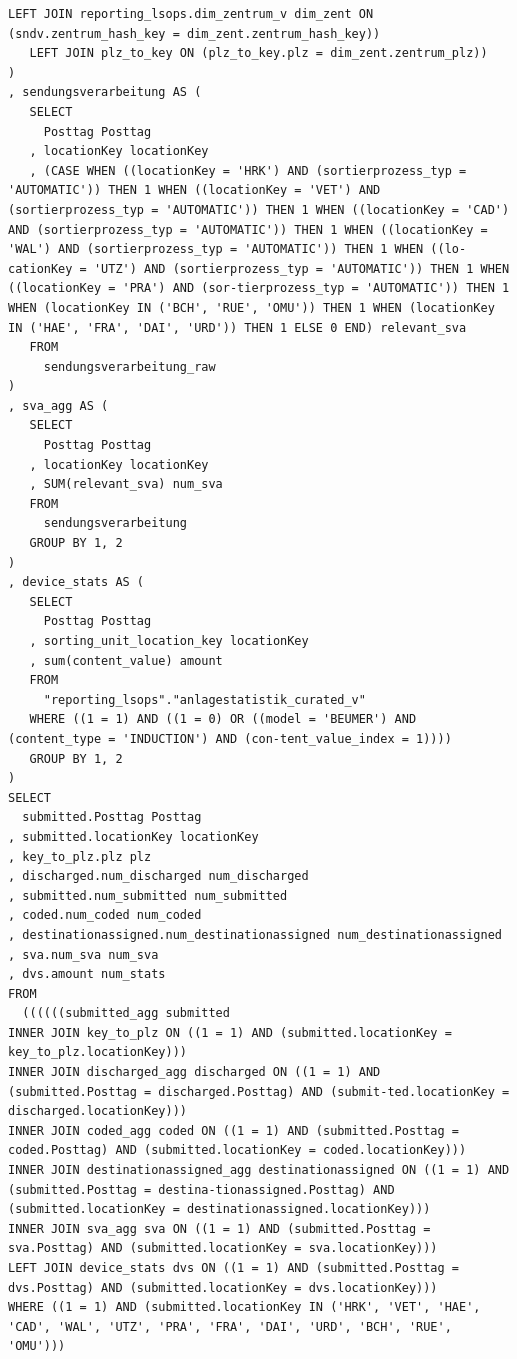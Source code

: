 \begin{lstlisting}[style=sqlstyle]
   LEFT JOIN reporting_lsops.dim_zentrum_v dim_zent ON (sndv.zentrum_hash_key = dim_zent.zentrum_hash_key))
   LEFT JOIN plz_to_key ON (plz_to_key.plz = dim_zent.zentrum_plz))
) 
, sendungsverarbeitung AS (
   SELECT
     Posttag Posttag
   , locationKey locationKey
   , (CASE WHEN ((locationKey = 'HRK') AND (sortierprozess_typ = 'AUTOMATIC')) THEN 1 WHEN ((locationKey = 'VET') AND (sortierprozess_typ = 'AUTOMATIC')) THEN 1 WHEN ((locationKey = 'CAD') AND (sortierprozess_typ = 'AUTOMATIC')) THEN 1 WHEN ((locationKey = 'WAL') AND (sortierprozess_typ = 'AUTOMATIC')) THEN 1 WHEN ((lo-cationKey = 'UTZ') AND (sortierprozess_typ = 'AUTOMATIC')) THEN 1 WHEN ((locationKey = 'PRA') AND (sor-tierprozess_typ = 'AUTOMATIC')) THEN 1 WHEN (locationKey IN ('BCH', 'RUE', 'OMU')) THEN 1 WHEN (locationKey IN ('HAE', 'FRA', 'DAI', 'URD')) THEN 1 ELSE 0 END) relevant_sva
   FROM
     sendungsverarbeitung_raw
) 
, sva_agg AS (
   SELECT
     Posttag Posttag
   , locationKey locationKey
   , SUM(relevant_sva) num_sva
   FROM
     sendungsverarbeitung
   GROUP BY 1, 2
) 
, device_stats AS (
   SELECT
     Posttag Posttag
   , sorting_unit_location_key locationKey
   , sum(content_value) amount
   FROM
     "reporting_lsops"."anlagestatistik_curated_v"
   WHERE ((1 = 1) AND ((1 = 0) OR ((model = 'BEUMER') AND (content_type = 'INDUCTION') AND (con-tent_value_index = 1))))
   GROUP BY 1, 2
) 
SELECT
  submitted.Posttag Posttag
, submitted.locationKey locationKey
, key_to_plz.plz plz
, discharged.num_discharged num_discharged
, submitted.num_submitted num_submitted
, coded.num_coded num_coded
, destinationassigned.num_destinationassigned num_destinationassigned
, sva.num_sva num_sva
, dvs.amount num_stats
FROM
  ((((((submitted_agg submitted
INNER JOIN key_to_plz ON ((1 = 1) AND (submitted.locationKey = key_to_plz.locationKey)))
INNER JOIN discharged_agg discharged ON ((1 = 1) AND (submitted.Posttag = discharged.Posttag) AND (submit-ted.locationKey = discharged.locationKey)))
INNER JOIN coded_agg coded ON ((1 = 1) AND (submitted.Posttag = coded.Posttag) AND (submitted.locationKey = coded.locationKey)))
INNER JOIN destinationassigned_agg destinationassigned ON ((1 = 1) AND (submitted.Posttag = destina-tionassigned.Posttag) AND (submitted.locationKey = destinationassigned.locationKey)))
INNER JOIN sva_agg sva ON ((1 = 1) AND (submitted.Posttag = sva.Posttag) AND (submitted.locationKey = sva.locationKey)))
LEFT JOIN device_stats dvs ON ((1 = 1) AND (submitted.Posttag = dvs.Posttag) AND (submitted.locationKey = dvs.locationKey)))
WHERE ((1 = 1) AND (submitted.locationKey IN ('HRK', 'VET', 'HAE', 'CAD', 'WAL', 'UTZ', 'PRA', 'FRA', 'DAI', 'URD', 'BCH', 'RUE', 'OMU')))

\end{lstlisting}



